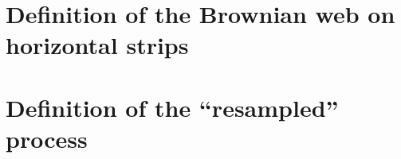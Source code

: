 {
\section{Definition of the Brownian web on horizontal strips}

\section{Definition of the ``resampled'' process}
}
